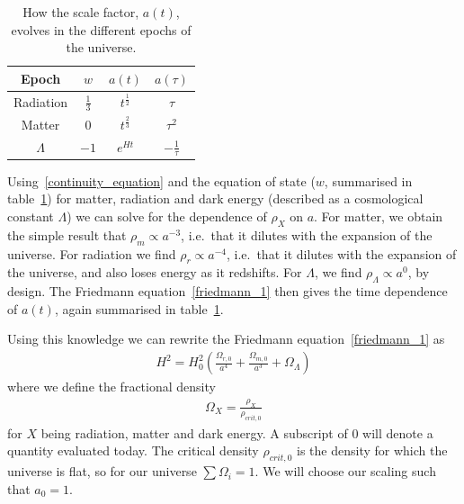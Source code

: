     \begin{table}[h!]
    \begin{center}
        \begin{tabular}{ c c c c }
            Epoch & $w$ & $a(t)$ & $a(\tau)$ \\ 
            \toprule
            Radiation & $\frac{1}{3}$ & $t^{\frac{1}{2}}$ & $\tau$ \\
            Matter & $0$ & $t^{\frac{2}{3}}$ & $\tau^2$ \\
            $\Lambda$ & $-1$ & $e^{Ht}$ & $-\frac{1}{\tau}$
        \end{tabular}\caption{
            How the scale factor, $a(t)$, evolves in the
            different epochs of the universe.
        }\label{lcdm_dep_table}
    \end{center}
    \end{table}



    Using~\eqref{continuity_equation} and the equation of state ($w$, summarised in table~\ref{lcdm_dep_table})
    for matter, radiation and dark energy (described as a cosmological constant $\Lambda$)
    we can solve for the dependence of $\rho_X$ on $a$.
    For matter, we obtain the simple result that $\rho_m\propto a^{-3}$,
    i.e.\ that it dilutes with the expansion of the universe.
    For radiation we find $\rho_r\propto a^{-4}$,
    i.e.\ that it dilutes with the expansion of the universe,
    and also loses energy as it redshifts.
    For $\Lambda$, we find $\rho_\Lambda\propto a^0$, by design.
    The Friedmann equation~\eqref{friedmann_1} then gives the time dependence of
    $a(t)$, again summarised in table~\ref{lcdm_dep_table}.


    Using this knowledge we can
    rewrite the Friedmann equation~\eqref{friedmann_1} as
    \begin{align}\label{friedmann_omega}
        H^2 = H_0^2\left(\frac{\Omega_{r,0}}{a^4}+\frac{\Omega_{m,0}}{a^3}+\Omega_{\Lambda}\right)
    \end{align}
    where we define the fractional density
    \begin{align}
        \Omega_{X} = \frac{\rho_X}{\rho_{crit,0}}
    \end{align}
    for $X$ being radiation, matter and dark energy.
    A subscript of $0$ will denote a quantity evaluated today.
    The critical density $\rho_{crit,0}$ is the density for which the universe is flat,
    so for our universe $\sum\Omega_i=1$.
    We will choose our scaling such that $a_0=1$.


